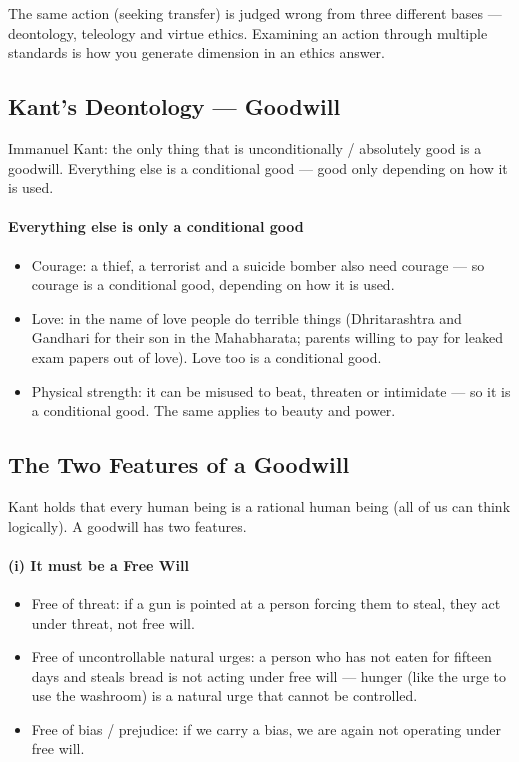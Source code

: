 \begin{CriticalPoint}
The same action (seeking transfer) is judged wrong from three different bases --- deontology, teleology and virtue ethics. Examining an action through multiple standards is how you generate dimension in an ethics answer.
\end{CriticalPoint}

\subsection{Kant's Deontology --- Goodwill}

\begin{KeyConcept}
Immanuel Kant: the only thing that is unconditionally / absolutely good is a goodwill. Everything else is a conditional good --- good only depending on how it is used.
\end{KeyConcept}

\paragraph{Everything else is only a conditional good}
\begin{itemize}
\item Courage: a thief, a terrorist and a suicide bomber also need courage --- so courage is a conditional good, depending on how it is used.
\item Love: in the name of love people do terrible things (Dhritarashtra and Gandhari for their son in the Mahabharata; parents willing to pay for leaked exam papers out of love). Love too is a conditional good.
\item Physical strength: it can be misused to beat, threaten or intimidate --- so it is a conditional good. The same applies to beauty and power.
\end{itemize}

\subsection{The Two Features of a Goodwill}

Kant holds that every human being is a rational human being (all of us can think logically). A goodwill has two features.

\paragraph{(i) It must be a Free Will}
\begin{itemize}
\item Free of threat: if a gun is pointed at a person forcing them to steal, they act under threat, not free will.
\item Free of uncontrollable natural urges: a person who has not eaten for fifteen days and steals bread is not acting under free will --- hunger (like the urge to use the washroom) is a natural urge that cannot be controlled.
\item Free of bias / prejudice: if we carry a bias, we are again not operating under free will.
\end{itemize}

